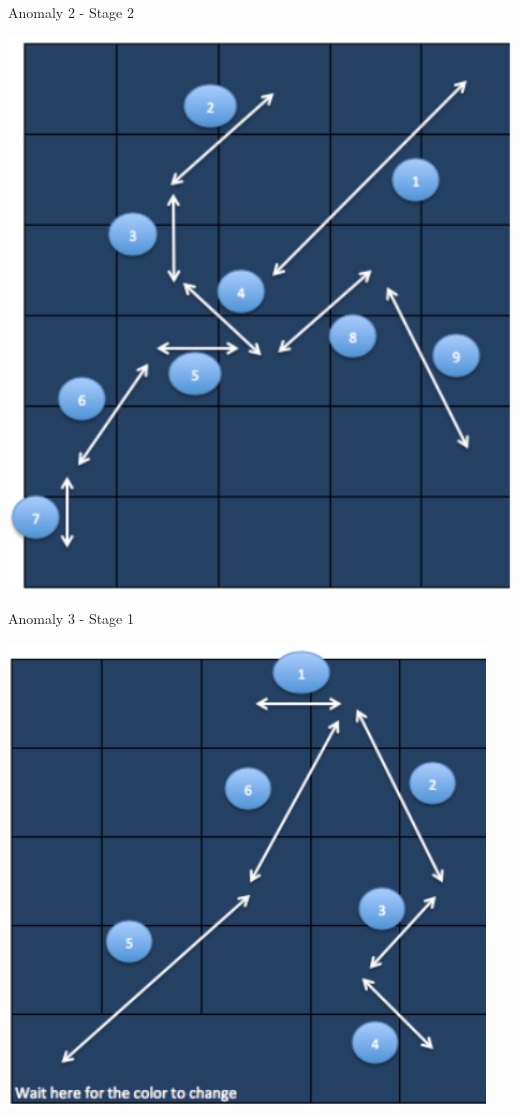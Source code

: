 Anomaly 2 - Stage 2

\includegraphics{Images/anomaly2stage2}


Anomaly 3 - Stage 1

\includegraphics{Images/anomaly3stage1}

